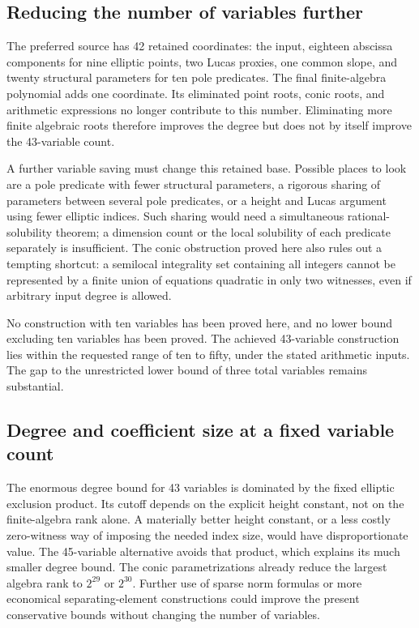 \subsection{Reducing the number of variables further}

The preferred source has 42 retained coordinates: the input, eighteen
abscissa components for nine elliptic points, two Lucas proxies, one
common slope, and twenty structural parameters for ten pole predicates.
The final finite-algebra polynomial adds one coordinate. Its eliminated
point roots, conic roots, and arithmetic expressions no longer contribute
to this number. Eliminating more finite algebraic roots therefore improves
the degree but does not by itself improve the 43-variable count.

A further variable saving must change this retained base. Possible places
to look are a pole predicate with fewer structural parameters, a rigorous
sharing of parameters between several pole predicates, or a height and
Lucas argument using fewer elliptic indices. Such sharing would need a
simultaneous rational-solubility theorem; a dimension count or the local
solubility of each predicate separately is insufficient. The conic
obstruction proved here also rules out a tempting shortcut: a semilocal
integrality set containing all integers cannot be represented by a finite
union of equations quadratic in only two witnesses, even if arbitrary
input degree is allowed.

No construction with ten variables has been proved here, and no lower
bound excluding ten variables has been proved. The achieved 43-variable
construction lies within the requested range of ten to fifty, under the
stated arithmetic inputs. The gap to the unrestricted lower bound of
three total variables remains substantial.

\subsection{Degree and coefficient size at a fixed variable count}

The enormous degree bound for 43 variables is dominated by the fixed
elliptic exclusion product. Its cutoff depends on the explicit height
constant, not on the finite-algebra rank alone. A materially better
height constant, or a less costly zero-witness way of imposing the needed
index size, would have disproportionate value. The 45-variable alternative
avoids that product, which explains its much smaller degree bound.
The conic parametrizations already reduce the largest algebra rank to
$2^{29}$ or $2^{30}$. Further use of sparse norm formulas or more economical
separating-element constructions could improve the present conservative
bounds without changing the number of variables.

